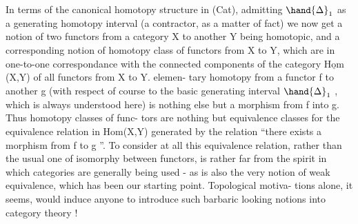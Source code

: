 In terms of the canonical homotopy structure in (Cat),  admitting
$\hand{\Delta}_1$ as a generating homotopy interval (a contractor,  as a matter of fact)\hand{,}
we now get a notion of two functors from a category X to another Y
being homotopic,  and a corresponding notion of homotopy class of functors
from X to Y,  which are in one-to-one correspondance with the connected
components of the category $\underline{\mathrm{Hom}}$(X,Y) of all functors from X to Y.  elemen-%
tary homotopy from a functor f to another g  (with respect of course to
the basic generating interval $\hand{\Delta}_1$ ,  which is always understood here) is
nothing else but a morphism from f into g.  Thus homotopy classes of func-%
tors are nothing but equivalence classes for the equivalence relation in
Hom(X,Y)  generated by the relation  ``there exists a morphism from f to
g ''.  To consider at all this equivalence relation,  rather than the usual
one of isomorphy between functors,  is rather far from the spirit in which
categories are generally being used  -   as is also the very notion of
 weak equivalence,  which has been our starting point.  Topological motiva-%
tions alone,  it seems,  would induce anyone to introduce such barbaric
looking notions into category theory !

